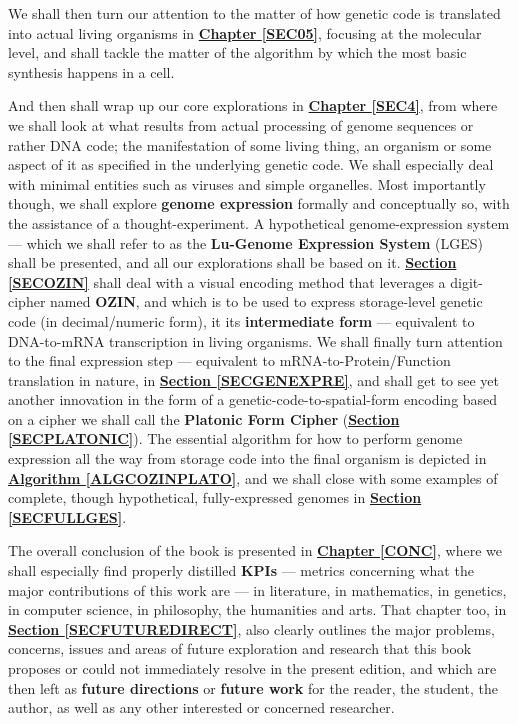 \documentclass[a4paper, 18pt]{book} %
\begin{document}
We shall then turn our attention to the matter of how genetic code is translated into actual living organisms in \textbf{\hyperref[SEC05]{Chapter \ref{SEC05}}}, focusing at the molecular level, and shall tackle the matter of the algorithm by which the most basic synthesis happens in a cell.


And then shall wrap up our core explorations in \textbf{\hyperref[SEC4]{Chapter \ref{SEC4}}}, from where we shall look at what results from actual processing of genome sequences or rather DNA code; the manifestation of some living thing, an organism or some aspect of it as specified in the underlying genetic code. We shall especially deal with minimal entities such as viruses and simple organelles. Most importantly though, we shall explore \textbf{genome expression} formally and conceptually so, with the assistance of a thought-experiment. A hypothetical genome-expression system --- which we shall refer to as the \textbf{Lu-Genome Expression System} (LGES) shall be presented, and all our explorations shall be based on it. \textbf{\hyperref[SECOZIN]{Section \ref{SECOZIN}}} shall deal with a visual encoding method that leverages a digit-cipher named \textbf{OZIN}\cite{lutalo_2025_grimlumtauto}, and which is to be used to express storage-level genetic code (in decimal/numeric form), it its \textbf{intermediate form} --- equivalent to DNA-to-mRNA transcription in living organisms. We shall finally turn attention to the final expression step --- equivalent to mRNA-to-Protein/Function translation in nature, in \textbf{\hyperref[SECGENEXPRE]{Section \ref{SECGENEXPRE}}}, and shall get to see yet another innovation in the form of a genetic-code-to-spatial-form encoding based on a cipher we shall call the \textbf{Platonic Form Cipher} (\textbf{\hyperref[SECPLATONIC]{Section \ref{SECPLATONIC}}}). The essential algorithm for how to perform genome expression all the way from storage code into the final organism is depicted in \textbf{\hyperref[ALGCOZINPLATO]{Algorithm \ref{ALGCOZINPLATO}}}, and we shall close with some examples of complete, though hypothetical, fully-expressed genomes in \textbf{\hyperref[SECFULLGES]{Section \ref{SECFULLGES}}}.

The overall conclusion of the book is presented in \textbf{\hyperref[CONC]{Chapter \ref{CONC}}}, where we shall especially find properly distilled \textbf{KPIs} --- metrics concerning what the major contributions of this work are --- in literature, in mathematics, in genetics, in computer science, in philosophy, the humanities and arts. That chapter too, in \textbf{\hyperref[SECFUTUREDIRECT]{Section \ref{SECFUTUREDIRECT}}}, also clearly outlines the major problems, concerns, issues and areas of future exploration and research that this book proposes or could not immediately resolve in the present edition, and which are then left as \textbf{future directions} or \textbf{future work} for the reader, the student, the author, as well as any other interested or concerned researcher.
\end{document}
